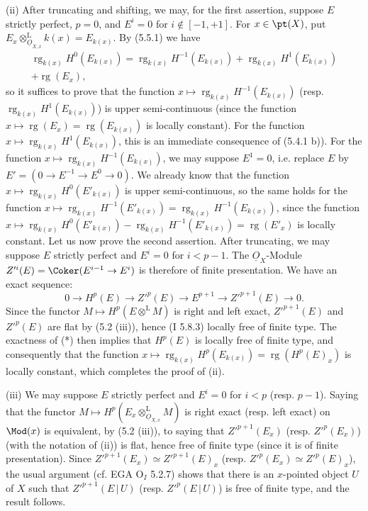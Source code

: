 (ii) After truncating and shifting, we may, for the first assertion, suppose \(E\) strictly perfect, \(p=0\), and \(E^i=0\) for \(i\notin[-1,+1]\). For \(x\in\pt(X)\), put \(E_x\otimes_{\underline{O}_{X,x}}^{\mathrm L}k(x)=E_{k(x)}\). By (5.5.1) we have
\[
\begin{gathered}
 \operatorname{rg}_{k(x)}H^0(E_{k(x)})=\operatorname{rg}_{k(x)}H^{-1}(E_{k(x)})+\operatorname{rg}_{k(x)}H^1(E_{k(x)})\\
 +\operatorname{rg}(E_x),
\end{gathered}
\]
so it suffices to prove that the function \(x\mapsto\operatorname{rg}_{k(x)}H^{-1}(E_{k(x)})\) (resp. \(\operatorname{rg}_{k(x)}H^1(E_{k(x)})\)) is upper semi-continuous (since the function \(x\mapsto\operatorname{rg}(E_x)=\operatorname{rg}(E_{k(x)})\) is locally constant). For the function \(x\mapsto\operatorname{rg}_{k(x)}H^1(E_{k(x)})\), this is an immediate consequence of (5.4.1 b)). For the function \(x\mapsto\operatorname{rg}_{k(x)}H^{-1}(E_{k(x)})\), we may suppose \(E^1=0\), i.e. replace \(E\) by \(E'=(0\to E^{-1}\to E^0\to0)\). We already know that the function \(x\mapsto\operatorname{rg}_{k(x)}H^0(E'_{k(x)})\) is upper semi-continuous, so the same holds for the function \(x\mapsto\operatorname{rg}_{k(x)}H^{-1}(E'_{k(x)})=\operatorname{rg}_{k(x)}H^{-1}(E_{k(x)})\), since the function \(x\mapsto\operatorname{rg}_{k(x)}H^0(E'_{k(x)})-\operatorname{rg}_{k(x)}H^{-1}(E'_{k(x)})=\operatorname{rg}(E'_x)\) is locally constant. Let us now prove the second assertion. After truncating, we may suppose \(E\) strictly perfect and \(E^i=0\) for \(i<p-1\). The \(\underline{O}_X\)-Module \(Z'^i(E)=\Coker(E^{i-1}\to E^i)\) is therefore of finite presentation. We have an exact sequence:
\begin{equation}
 0\to H^p(E)\to Z'^p(E)\to E^{p+1}\to Z'^{p+1}(E)\to0.\tag{$*$}
\end{equation}
Since the functor \(M\mapsto H^p(E\otimes^{\mathrm L}M)\) is right and left exact, \(Z'^{p+1}(E)\) and \(Z'^p(E)\) are flat by (5.2 (iii)), hence (I 5.8.3) locally free of finite type. The exactness of (*) then implies that \(H^p(E)\) is locally free of finite type, and consequently that the function \(x\mapsto\operatorname{rg}_{k(x)}H^p(E_{k(x)})=\operatorname{rg}(H^p(E)_x)\)
%
is locally constant, which completes the proof of (ii).

(iii) We may suppose \(E\) strictly perfect and \(E^i=0\) for \(i<p\) (resp. \(p-1\)). Saying that the functor \(M\mapsto H^p(E_x\otimes_{\underline{O}_{X,x}}^{\mathrm L}M)\) is right exact (resp. left exact) on \(\Mod(x)\) is equivalent, by (5.2 (iii)), to saying that \(Z'^{p+1}(E_x)\) (resp. \(Z'^p(E_x)\)) (with the notation of (ii)) is flat, hence free of finite type (since it is of finite presentation). Since \(Z'^{p+1}(E_x)\simeq Z'^{p+1}(E)_x\) (resp. \(Z'^p(E_x)\simeq Z'^p(E)_x\)), the usual argument (cf. EGA \(\mathrm O_I\) 5.2.7) shows that there is an \(x\)-pointed object \(U\) of \(X\) such that \(Z'^{p+1}(E\,|\,U)\) (resp. \(Z'^p(E\,|\,U)\)) is free of finite type, and the result follows.

